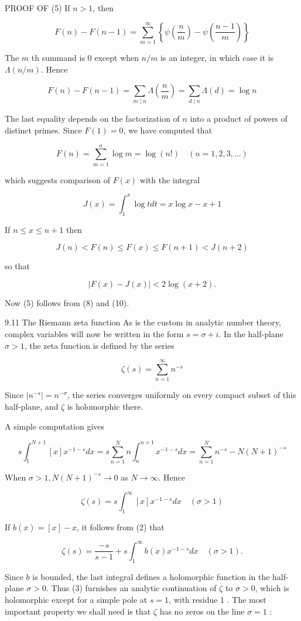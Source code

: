 \documentclass[10pt]{article}
\begin{document}
PROOF OF (5) If $n>1$, then

$$
F(n)-F(n-1)=\sum_{m=1}^{\infty}\left\{\psi\left(\frac{n}{m}\right)-\psi\left(\frac{n-1}{m}\right)\right\}
$$

The $m$ th summand is 0 except when $n / m$ is an integer, in which case it is $\Lambda(n / m)$. Hence

$$
F(n)-F(n-1)=\sum_{m \mid n} \Lambda\left(\frac{n}{m}\right)=\sum_{d \mid n} \Lambda(d)=\log n
$$

The last equality depends on the factorization of $n$ into a product of powers of distinct primes. Since $F(1)=0$, we have computed that

$$
F(n)=\sum_{m=1}^{n} \log m=\log (n !) \quad(n=1,2,3, \ldots)
$$

which suggests comparison of $F(x)$ with the integral

$$
J(x)=\int_{1}^{x} \log t d t=x \log x-x+1
$$

If $n \leq x \leq n+1$ then

$$
J(n)<F(n) \leq F(x) \leq F(n+1)<J(n+2)
$$

so that

$$
|F(x)-J(x)|<2 \log (x+2) .
$$

Now (5) follows from (8) and (10).

9.11 The Riemann zeta function As is the custom in analytic number theory, complex variables will now be written in the form $s=\sigma+i$. In the half-plane $\sigma>1$, the zeta function is defined by the series

$$
\zeta(s)=\sum_{n=1}^{\infty} n^{-s}
$$

Since $\left|n^{-s}\right|=n^{-\sigma}$, the series converges uniformly on every compact subset of this half-plane, and $\zeta$ is holomorphic there.

A simple computation gives

$$
s \int_{1}^{N+1}[x] x^{-1-s} d x=s \sum_{n=1}^{N} n \int_{n}^{n+1} x^{-1-s} d x=\sum_{n=1}^{N} n^{-s}-N(N+1)^{-s}
$$

When $\sigma>1, N(N+1)^{-s} \rightarrow 0$ as $N \rightarrow \infty$. Hence

$$
\zeta(s)=s \int_{1}^{\infty}[x] x^{-1-s} d x \quad(\sigma>1)
$$

If $b(x)=[x]-x$, it follows from (2) that

$$
\zeta(s)=\frac{-s}{s-1}+s \int_{1}^{\infty} b(x) x^{-1-s} d x \quad(\sigma>1) .
$$

Since $b$ is bounded, the last integral defines a holomorphic function in the half-plane $\sigma>0$. Thus (3) furnishes an analytic continuation of $\zeta$ to $\sigma>0$, which is holomorphic except for a simple pole at $s=1$, with residue 1 . The most important property we shall need is that $\zeta$ has no zeros on the line $\sigma=1$ :
\end{document}
